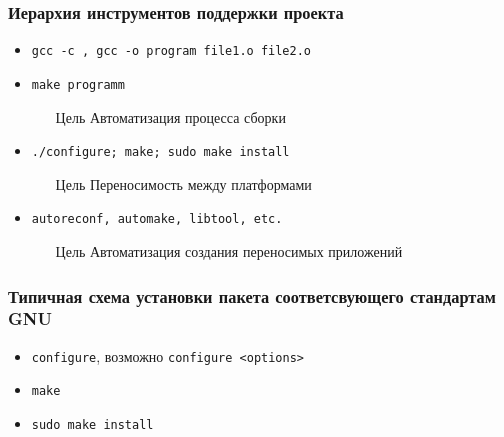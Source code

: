 \begin{frame}
 \frametitle{Иерархия инструментов поддержки проекта}
 \begin{itemize}
   \item \texttt{gcc -c , gcc -o program file1.o file2.o}
     \pause
   \item \texttt{make programm}
     \begin{enumerate}
       \item[Цель] Автоматизация процесса сборки
      \end{enumerate}
     \pause
   \item \texttt{./configure; make; sudo make install}
     \begin{enumerate}
       \item[Цель] Переносимость между платформами
      \end{enumerate}
     \pause
   \item \texttt{autoreconf, automake, libtool, etc.}
     \begin{enumerate}
       \item[Цель] Автоматизация создания переносимых приложений
      \end{enumerate}
 \end{itemize}
\end{frame}

\begin{frame}
  \frametitle{Типичная схема установки пакета соответсвующего стандартам GNU}
  \begin{itemize}
    \item \texttt{configure}, возможно \texttt{configure <options>}
    \item \texttt{make}
    \item \texttt{sudo make install} 
   \end{itemize}
\end{frame}




